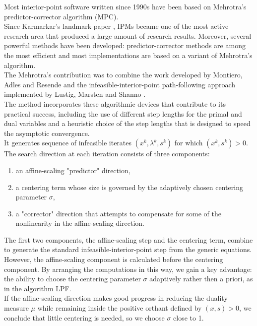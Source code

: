 \documentclass[a4paper,10 pt,titlepage,twoside]{book}
\theoremstyle{plain}
\theoremstyle{definition}
\theoremstyle{remark}
\begin{document}
Most interior-point software written since 1990s have been based on Mehrotra's predictor-corrector algorithm (MPC).\\
Since Karmarkar's landmark paper \cite{Kar}, IPMs became one of the most active research area that produced a large amount of research results. Moreover, several powerful methods have been developed: predictor-corrector methods are among the most efficient and most implementations are based on a variant of Mehrotra's algorithm. \\
The Mehrotra's contribution was to combine the work developed by Montiero, Adles and Resende \cite{MARE} and the infeasible-interior-point path-following approach implemented by Lustig, Marsten and Shanno \cite{LMS}.\\ 
The method incorporates these algorithmic devices that contribute to its practical success, including the use of different step lengths for the primal and dual variables and a heuristic choice of the step lengths that is designed to speed the asymptotic convergence.\\
It generates sequence of infeasible iterates $(x^{k},\lambda^{k},s^{k})$ for which $(x^{k},s^{k})>0$. The search direction at each iteration consists of three components:
\begin{enumerate}
	\item an affine-scaling "predictor" direction,
	\item a centering term whose size is governed by the adaptively chosen centering parameter $\sigma$,
	\item a "corrector" direction that attempts to compensate for some of the nonlinearity in the affine-scaling direction.
	\end{enumerate}
The first two components, the affine-scaling step and the centering term, combine to generate the standard infeasible-interior-point step from the generic equations. However, the affine-scaling component is calculated before the centering component. By arranging the computations in this way, we gain a key advantage: the ability to choose the centering parameter $\sigma$ adaptively rather then a priori, as in the algorithm LPF.\\
If the affine-scaling direction makes good progress in reducing the duality measure $\mu$ while remaining inside the positive orthant defined by $(x,s)>0$, we conclude that little centering is needed, so we choose $\sigma$ close to 1.
\end{document}
